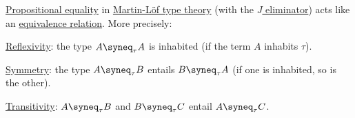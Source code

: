 \begin{proposition}\label{thm:propositional_equality_equivalence_relation}
  \hyperref[def:mltt_propositional_equality]{Propositional equality} in \hyperref[def:martin_lof_type_theory]{Martin-L\"of type theory} (with the \hyperref[def:identity_type/j]{\( J \) eliminator}) acts like an \hyperref[def:equivalence_relation]{equivalence relation}. More precisely:
  \begin{thmenum}
     \hyperref[def:relation_closures/reflexive]{Reflexivity}: the type \( A \syneq_\tau A \) is inhabited (if the term \( A \) inhabits \( \tau \)).

     \hyperref[def:relation_closures/symmetric]{Symmetry}: the type \( A \syneq_\tau B \) entails \( B \syneq_\tau A \) (if one is inhabited, so is the other).

     \hyperref[def:relation_closures/transitive]{Transitivity}: \( A \syneq_\tau B \) and \( B \syneq_\tau C \) entail \( A \syneq_\tau C \).
  \end{thmenum}
\end{proposition}
